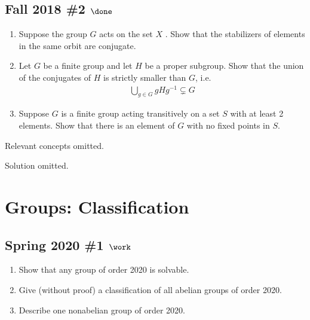 \hypertarget{fall-2018-2-done}{%
\subsection{\texorpdfstring{Fall 2018 \#2
\(\done\)}{Fall 2018 \#2 \textbackslash done}}\label{fall-2018-2-done}}

\begin{enumerate}
\def\labelenumi{\alph{enumi}.}
\item
  Suppose the group \(G\) acts on the set \(X\) . Show that the
  stabilizers of elements in the same orbit are conjugate.
\item
  Let \(G\) be a finite group and let \(H\) be a proper subgroup. Show
  that the union of the conjugates of \(H\) is strictly smaller than
  \(G\), i.e.
  \begin{align*}
  \bigcup_{g\in G} gHg^{-1}\subsetneq G
  \end{align*}
\item
  Suppose \(G\) is a finite group acting transitively on a set \(S\)
  with at least 2 elements. Show that there is an element of \(G\) with
  no fixed points in \(S\).
\end{enumerate}

Relevant concepts omitted.

Solution omitted.

\hypertarget{groups-classification}{%
\section{Groups: Classification}\label{groups-classification}}

\hypertarget{spring-2020-1-work}{%
\subsection{\texorpdfstring{Spring 2020 \#1
\(\work\)}{Spring 2020 \#1 \textbackslash work}}\label{spring-2020-1-work}}

\begin{enumerate}
\def\labelenumi{\alph{enumi}.}
\item
  Show that any group of order 2020 is solvable.
\item
  Give (without proof) a classification of all abelian groups of order
  2020.
\item
  Describe one nonabelian group of order 2020.
\end{enumerate}



